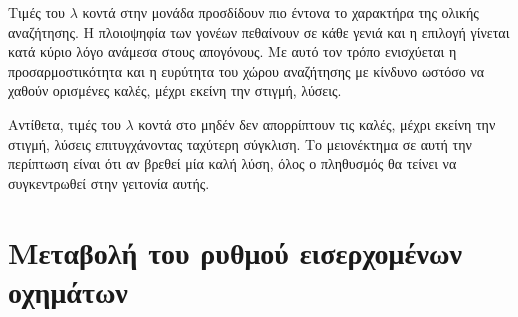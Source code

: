 \documentclass[a4paper,12pt]{article}
\begin{document}
Τιμές του $\lambda$ κοντά στην μονάδα προσδίδουν πιο έντονα το χαρακτήρα της ολικής αναζήτησης. Η πλοιοψηφία των
γονέων πεθαίνουν σε κάθε γενιά και η επιλογή γίνεται κατά κύριο λόγο ανάμεσα στους απογόνους. Με αυτό τον τρόπο 
ενισχύεται η προσαρμοστικότητα και η ευρύτητα του χώρου αναζήτησης με κίνδυνο ωστόσο να χαθούν ορισμένες καλές,
μέχρι εκείνη την στιγμή, λύσεις.

Αντίθετα, τιμές του $\lambda$ κοντά στο μηδέν δεν απορρίπτουν τις καλές, μέχρι εκείνη την στιγμή, λύσεις 
επιτυγχάνοντας ταχύτερη σύγκλιση. Το μειονέκτημα σε αυτή την περίπτωση είναι ότι αν βρεθεί μία καλή λύση,
όλος ο πληθυσμός θα τείνει να συγκεντρωθεί στην γειτονία αυτής.

\newpage

\section{Μεταβολή του ρυθμού εισερχομένων οχημάτων}
\end{document}
